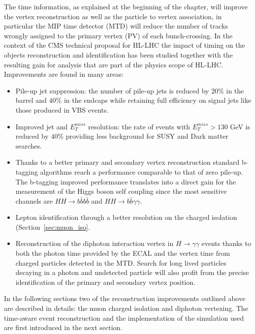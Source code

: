 The time information, as explained at the beginning of the chapter, will improve the vertex reconstruction as
well as the particle to vertex association, in particular the MIP time detector (MTD) will reduce the
number of tracks wrongly assigned to the primary vertex (PV) of each bunch-crossing.
In the context of the CMS technical proposal for HL-LHC the impact of timing on the objects reconstruction and
identification has been studied together with the resulting gain for analysis that are part of the physics scope
of HL-LHC.
Improvements are found in many areas:
\begin{itemize}
\item Pile-up jet suppression: the number of pile-up jets is reduced by $20\%$ in the barrel and $40\%$ in the endcaps
  while retaining full efficiency on signal jets like those produced in VBS events.
\item Improved jet and $E_T^{miss}$ resolution: the rate of events with $E_T^{miss}>130$ GeV is reduced by
  $40\%$ providing less background for SUSY and Dark matter searches.
\item Thanks to a better primary and secondary vertex reconstruction standard b-tagging algorithms reach
  a performance comparable to that of zero pile-up. The b-tagging improved performance translates into
  a direct gain for the measurement of the Higgs boson self coupling since the most sensitive channels
  are $HH\to b\bar{b}b\bar{b}$ and $HH \to b\bar{b}\gamma\gamma$. 
\item Lepton identification through a better resolution on the charged isolation (Section~\ref{sec:muon_iso}.
\item Reconstruction of the diphoton interaction vertex in $H\to\gamma\gamma$ events thanks to both the photon time
  provided by the ECAL and the vertex time from charged particles detected in the MTD. Search for long lived particles
  decaying in a photon and undetected particle will also profit from the precise identification of the primary and
  secondary vertex position. 
\end{itemize}

In the following sections two of the reconstruction improvements outlined above are described in details:
the muon charged isolation and diphoton vertexing. The time-aware event reconstruction and the implementation
of the simulation used are first introduced in the next section.

